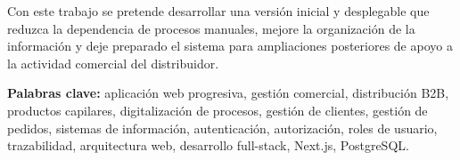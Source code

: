 Con este trabajo se pretende desarrollar una versión inicial y desplegable que reduzca la dependencia de procesos manuales, mejore la organización de la información y deje preparado el sistema para ampliaciones posteriores de apoyo a la actividad comercial del distribuidor.

\vspace{.5cm}

\noindent \textbf{Palabras clave:} aplicación web progresiva, gestión comercial, distribución B2B, productos capilares, digitalización de procesos, gestión de clientes, gestión de pedidos, sistemas de información, autenticación, autorización, roles de usuario, trazabilidad, arquitectura web, desarrollo full-stack, Next.js, PostgreSQL.
